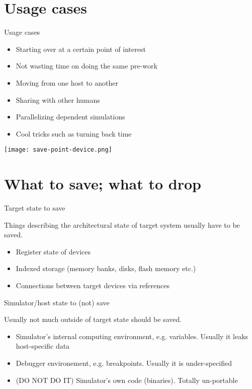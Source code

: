 \section{Usage cases}

\begin{frame}{Usage cases}
\begin{itemize}
    \item Starting over at a certain point of interest
    \item Not wasting time on doing the same pre-work
    \item Moving from one host to another
    \item Sharing with other humans
    \item Parallelizing dependent simulations
    \item Cool tricks such as turning back time
\end{itemize}

\pause

\texttt{[image: save-point-device.png]}

\end{frame}

\section{What to save; what to drop}

\begin{frame}{Target state to save}

Things describing the architectural state of target system usually have to be saved.

\begin{itemize}
    \item Register state of devices
    \item Indexed storage (memory banks, disks, flash memory etc.) \pause
    \item Connections between target devices via references
\end{itemize}

\end{frame}

\begin{frame}{Simulator/host state to (not) save}

Usually not much outside of target state should be saved.

\begin{itemize}
    \item Simulator's internal computing environment, e.g. variables. Usually it leaks host-specific data
    \item Debugger environement, e.g. breakpoints. Usually it is under-specified
    \item (DO NOT DO IT) Simulator's own code (binaries). Totally un-portable
\end{itemize}

\end{frame}

